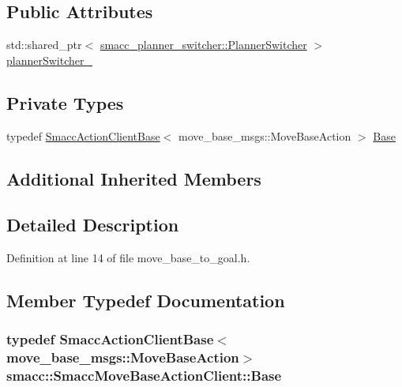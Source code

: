 \subsection*{Public Attributes}
\begin{DoxyCompactItemize}
\item 
std\+::shared\+\_\+ptr$<$ \hyperlink{classsmacc__planner__switcher_1_1PlannerSwitcher}{smacc\+\_\+planner\+\_\+switcher\+::\+Planner\+Switcher} $>$ \hyperlink{classsmacc_1_1SmaccMoveBaseActionClient_ae24164268108abf0b35cf51bfba5ec67}{planner\+Switcher\+\_\+}
\end{DoxyCompactItemize}
\subsection*{Private Types}
\begin{DoxyCompactItemize}
\item 
typedef \hyperlink{classsmacc_1_1SmaccActionClientBase}{Smacc\+Action\+Client\+Base}$<$ move\+\_\+base\+\_\+msgs\+::\+Move\+Base\+Action $>$ \hyperlink{classsmacc_1_1SmaccMoveBaseActionClient_ad64340f7f8ac723bdb639c2c830975a7}{Base}
\end{DoxyCompactItemize}
\subsection*{Additional Inherited Members}


\subsection{Detailed Description}


Definition at line 14 of file move\+\_\+base\+\_\+to\+\_\+goal.\+h.



\subsection{Member Typedef Documentation}
\subsubsection[{\texorpdfstring{Base}{Base}}]{\setlength{\rightskip}{0pt plus 5cm}typedef {\bf Smacc\+Action\+Client\+Base}$<$move\+\_\+base\+\_\+msgs\+::\+Move\+Base\+Action$>$ {\bf smacc\+::\+Smacc\+Move\+Base\+Action\+Client\+::\+Base}\hspace{0.3cm}{\ttfamily [private]}}\hypertarget{classsmacc_1_1SmaccMoveBaseActionClient_ad64340f7f8ac723bdb639c2c830975a7}{}\label{classsmacc_1_1SmaccMoveBaseActionClient_ad64340f7f8ac723bdb639c2c830975a7}


